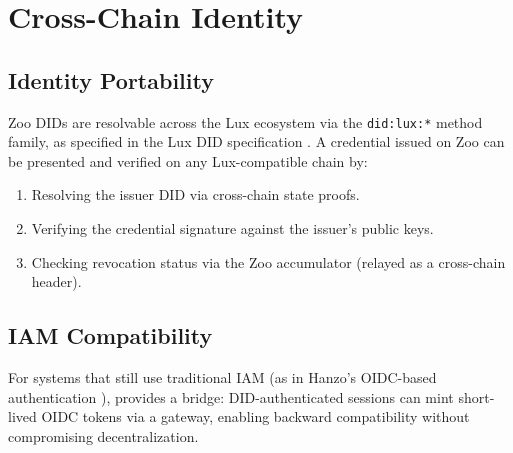 \section{Cross-Chain Identity}


\subsection{Identity Portability}

Zoo DIDs are resolvable across the Lux ecosystem via the \texttt{did:lux:*} method family, as specified in the Lux DID specification \cite{lux-id-did-specification}. A credential issued on Zoo can be presented and verified on any Lux-compatible chain by:

\begin{enumerate}
\item Resolving the issuer DID via cross-chain state proofs.
\item Verifying the credential signature against the issuer's public keys.
\item Checking revocation status via the Zoo accumulator (relayed as a cross-chain header).
\end{enumerate}

\subsection{IAM Compatibility}

For systems that still use traditional IAM (as in Hanzo's OIDC-based authentication \cite{lux-id-iam}), \IChain{} provides a bridge: DID-authenticated sessions can mint short-lived OIDC tokens via a gateway, enabling backward compatibility without compromising decentralization.

